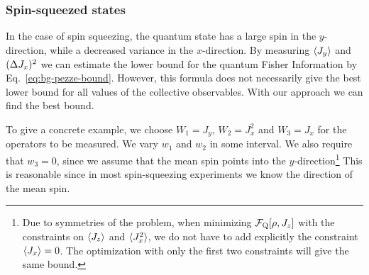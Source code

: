 \subsubsection{Spin-squeezed states}
\label{sec:lt-bound-spsq}

In the case of spin squeezing, the quantum state has a large spin in the $y$-direction, while a decreased variance in the $x$-direction.
By measuring $\langle{J_y}\rangle$ and $(\Delta J_x )^2$ we can estimate the lower bound for the quantum Fisher Information by Eq.~\eqref{eq:bg-pezze-bound}.
However, this formula does not necessarily give the best lower bound for all values of the collective observables.
With our approach we can find the best bound.

To give a concrete example, we choose $W_1=J_y$, $W_2=J_x^2$ and $W_3=J_x$ for the operators to be measured.
We vary $w_1$ and $w_2$ in some interval.
We also require that $w_3=0$, since we assume that the mean spin points into the $y$-direction\footnote{
Due to symmetries of the problem, when minimizing $\mathcal{F}_{\textnormal{Q}}[{\textstyle \rho,J_z}]$ with the constraints on $\langle{J_z}\rangle$ and $\langle{J_x^2}\rangle$, we do not have to add explicitly the constraint $\langle{J_x}\rangle=0$.
The optimization with only the first two constraints will give the same bound.}
This is reasonable since in most spin-squeezing experiments we know the direction of the mean spin.

